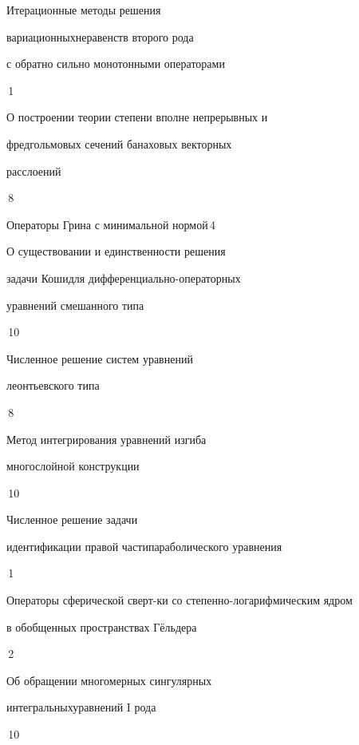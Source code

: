 {Итерационные методы решения


вариационных\newline неравенств второго рода


с обратно сильно монотонными операторами}{\No\,1}




{О построении теории степени вполне непрерывных и \newline 


фредгольмовых сечений банаховых векторных  


расслоений}{\No\,8}




{Операторы Грина с минимальной нормой}{\No\,4}




{О существовании и единственности решения  


задачи Коши\newline для дифференциально-операторных 


уравнений смешанного типа}{\No\,10}




{Численное решение систем уравнений


леонтьевского типа}{\No\,8}




{Метод интегрирования уравнений изгиба  


многослойной конструкции}{\No\,10}




{Численное решение задачи


идентификации правой части\newline параболического уравнения}{\No\,1}




{Операторы сферической сверт-\newline ки со степенно-логарифмическим ядром 


в обобщенных пространствах Г\"ельдера}{\No\,2}




{Об обращении многомерных сингулярных


интегральных\newline уравнений I рода}{\No\,10}




